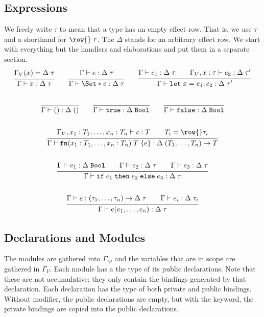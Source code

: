 \subsection{Expressions}
We freely write $\tau$ to mean that a type has an empty effect row. That is, we use $\tau$ and a shorthand for $\row{}\;\tau$. The $\Delta$ stands for an arbitrary effect row. We start with everything but the handlers and elaborations and put them in a separate section.
\begin{gather*}
    \infer{
        \Gamma \vdash x : \Delta\;\tau
    }{
        \Gamma_V(x) = \Delta\;\tau
    }
    \qquad
    \infer{
        \Gamma \vdash \S{e} : \Delta\;\tau
    }{
        \Gamma \vdash e : \Delta\;\tau
    }
    \qquad
    \infer{
        \Gamma \vdash \kw{let}\;x = e_1; e_2 : \Delta\;\tau'
    }{
        \Gamma \vdash e_1 : \Delta\;\tau
        \qquad
        \Gamma_V, x: \tau \vdash e_2 : \Delta\;\tau'
    }
    \\\\
    \infer{
        \Gamma \vdash \unit: \Delta\;\unit
    }{}
    \qquad
    \infer{\Gamma \vdash \true : \Delta\;\Bool}{}
    \qquad
    \infer{\Gamma \vdash \false : \Delta\;\Bool}{}
    \\\\
    \infer{
        \Gamma \vdash \fn(x_1: T_1,\dots,x_n: T_n)\;T\; \{e\}: \Delta\;(T_1,\dots, T_n) \to T
    }{
        \Gamma_V, x_1: T_1, \dots, x_n: T_n \vdash c : T
        \qquad
        T_i = \row{} \tau_i
    }
    \\\\
    \infer{
        \Gamma \vdash \cond{e_1}{e_2}{e_3} : \Delta\;\tau
    }{
        \Gamma \vdash e_1 : \Delta\;\Bool
        \qquad
        \Gamma \vdash e_2 : \Delta\;\tau
        \qquad
        \Gamma \vdash e_3 : \Delta\;\tau
    }
    \\\\
    \infer{
        \Gamma \vdash e(e_1, \dots, e_n): \Delta\;\tau
    }{
        \Gamma \vdash e: (\tau_1, \dots, \tau_n) \to \Delta\;\tau
        \qquad
        \Gamma \vdash e_i : \Delta\;\tau_i
    }
\end{gather*}

\subsection{Declarations and Modules}

The modules are gathered into $\Gamma_M$ and the variables that are in scope are gathered in $\Gamma_V$. Each module has a the type of its public declarations. Note that these are not accumulative; they only contain the bindings generated by that declaration. Each declaration has the type of both private and public bindings. Without modifier, the public declarations are empty, but with the  keyword, the private bindings are copied into the public declarations. 

